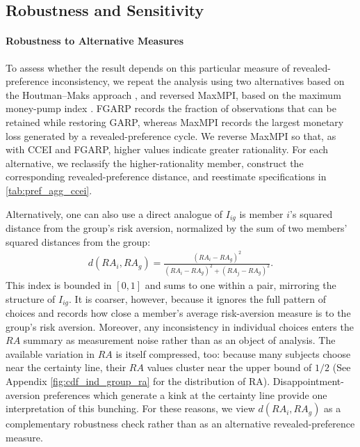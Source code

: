 \documentclass[11 pt]{article}
\begin{document}
\subsection{Robustness and Sensitivity}
\paragraph{Robustness to Alternative Measures} To assess whether the result depends on this particular measure of revealed-preference inconsistency, we repeat the analysis using two alternatives based on the Houtman--Maks approach \citep{houtman1985determining}, and reversed MaxMPI, based on the maximum money-pump index \citep{echenique2011money}. FGARP records the fraction of observations that can be retained while restoring GARP, whereas MaxMPI records the largest monetary loss generated by a revealed-preference cycle. We reverse MaxMPI so that, as with CCEI and FGARP, higher values indicate greater rationality. For each alternative, we reclassify the higher-rationality member, construct the corresponding revealed-preference distance, and reestimate specifications in \autoref{tab:pref_agg_ccei}.

Alternatively, one can also use a direct analogue of $I_{ig}$ is member $i$'s squared distance from the group's risk aversion, normalized by the sum of two members' squared distances from the group:
\begin{align}\label{eqn:simple_measure}
d(RA_i, RA_g) = \frac{(RA_i - RA_g)^2}{(RA_i - RA_g)^2 + (RA_j - RA_g)^2}.
\end{align}
This index is bounded in $[0, 1]$ and sums to one within a pair, mirroring the structure of $I_{ig}$. It is  coarser, however, because it ignores the full pattern of choices and records how close a member's average risk-aversion measure is to the group's risk aversion. Moreover, any inconsistency in individual choices enters the $RA$ summary as measurement noise rather than as an object of analysis.  The available variation in $RA$ is itself compressed, too: because many subjects choose near the certainty line, their $RA$ values cluster near the upper bound of $1/2$ (See Appendix \autoref{fig:cdf_ind_group_ra} for the distribution of RA). Disappointment-aversion preferences \citep{Gul:1991:ECMA} which generate a kink at the certainty line provide one interpretation of this bunching. For these reasons, we view $d(RA_i, RA_g)$ as a complementary robustness check rather than as an alternative revealed-preference measure.
\end{document}
